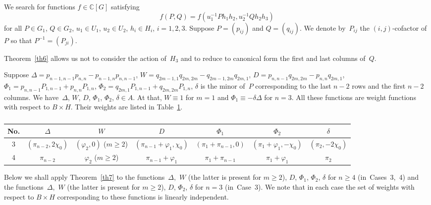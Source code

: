 \documentclass[12pt]{amsart}
\theoremstyle{definition}
\theoremstyle{remark}
\begin{document}
We search for functions $f\in \mathbb{C}[G]$ satisfying
$$
f(P,Q)=f(u_1^{-1}Ph_1h_2,u_2^{-1}Qh_2h_3)
$$
for all $P\in G_1$, $Q\in G_2$, $u_1\in U_1$, $u_2\in U_2$, $h_i\in
H_i$, $i=1,2,3$. Suppose $P=(p_{ij})$ and $Q=(q_{ij})$. We denote
by~$P_{ij}$ the $(i,j)$-cofactor of $P$ so that $P^{-1}=(P_{ji})$.

Theorem~\ref{th6} allows us not to consider the action of~$H_3$ and
to reduce to canonical form the first and last columns of~$Q$.

Suppose $\Delta=p_{n-1,n-1}p_{n,n}-p_{n-1,n}p_{n,n-1}$,
$W=q_{2m-1,1}q_{2m,2m}-q_{2m-1,2m}q_{2m,1}$,
$D=p_{n,n-1}q_{2m,2m}-p_{n,n}q_{2m,1}$,
$\Phi_1=p_{n,n-1}P_{1,n-1}+p_{n,n}P_{1,n}$,
$\Phi_2=q_{2m,1}P_{1,n-1}+q_{2m,2m}P_{1,n}$, $\delta$ is the minor
of~$P$ corresponding to the last $n-2$ rows and the first $n-2$
columns. We have~$\Delta$, $W$, $D$, $\Phi_1$, $\Phi_2$, $\delta\in
A$. At that, $W\equiv1$ for $m=1$ and $\Phi_1\equiv-\delta\Delta$
for $n=3$. All these functions are weight functions with respect to
$B\times H$. Their weights are listed in Table~\ref{tab2}.

\begin{table}[h]

\begin{center}
\caption{} \vskip3mm \label{tab2} \footnotesize{
\begin{tabular}{|c|c|c|c|c|c|c|}
\hline No. & $\Delta$ & $W$ & $D$ & $\Phi_1$ & $\Phi_2$ & $\delta$
\\
\hline 3 & $(\pi_{n-2},2\chi_0)$ & $(\varphi_2,0)$ ($m{\geqslant}2$) &
$(\pi_{n-1}{+}\varphi_1,\chi_0)$ & $(\pi_1{+}\pi_{n-1},0)$ &
$(\pi_1{+}\varphi_1,-\chi_0)$ & $(\pi_2,-2\chi_0)$
\\
\hline 4 & $\pi_{n-2}$ & $\varphi_2$ ($m{\geqslant}2$) &
$\pi_{n-1}{+}\varphi_1$ & $\pi_1{+}\pi_{n-1}$ & $\pi_1{+}\varphi_1$
& $\pi_2$
\\
\hline
\end{tabular}
}
\end{center}
\end{table}

Below we shall apply Theorem~\ref{th7} to the
functions~$\Delta$,~$W$ (the latter is present for $m{\geqslant}2$), $D$,
$\Phi_1$, $\Phi_2$, $\delta$ for $n{\geqslant}4$ (in~Cases~3,~4) and the
functions~$\Delta$,~$W$ (the latter is present for $m{\geqslant}2$), $D$,
$\Phi_2$, $\delta$ for $n=3$ (in~Case~3). We note that in each case
the set of weights with respect to $B\times H$ corresponding to
these functions is linearly independent.
\end{document}
